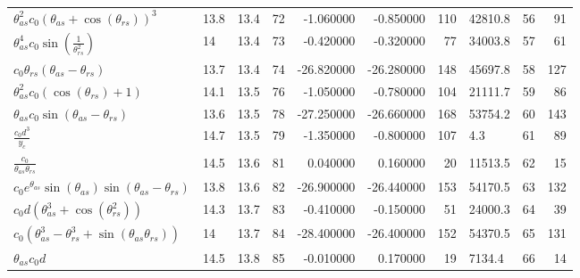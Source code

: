\begin{tabularx}{\textwidth}{lllrrrrlrr}
$ \theta_{as}^{2} c_{0} \left(\theta_{as} + \cos{\left(\theta_{rs} \right)}\right)^{3} $  &  13.8  &  13.4  &  72  &  -1.060000  &  -0.850000  &  110  &  42810.8  &  56\phantom{.000000}  &  91\phantom{.000000}  \\ 
$ \theta_{as}^{4} c_{0} \sin{\left(\displaystyle\frac{1}{\theta_{rs}^{2}} \right)} $  &  14\phantom{.0}  &  13.4  &  73  &  -0.420000  &  -0.320000  &  77  &  34003.8  &  57\phantom{.000000}  &  61\phantom{.000000}  \\ 
$ c_{0} \theta_{rs} \left(\theta_{as} - \theta_{rs}\right) $  &  13.7  &  13.4  &  74  &  -26.820000  &  -26.280000  &  148  &  45697.8  &  58\phantom{.000000}  &  127\phantom{.000000}  \\ 
$ \theta_{as}^{2} c_{0} \left(\cos{\left(\theta_{rs} \right)} + 1\right) $  &  14.1  &  13.5  &  76  &  -1.050000  &  -0.780000  &  104  &  21111.7  &  59\phantom{.000000}  &  86\phantom{.000000}  \\ 
$ \theta_{as} c_{0} \sin{\left(\theta_{as} - \theta_{rs} \right)} $  &  13.6  &  13.5  &  78  &  -27.250000  &  -26.660000  &  168  &  53754.2  &  60\phantom{.000000}  &  143\phantom{.000000}  \\ 
$ \displaystyle\frac{c_{0} d^{3}}{y_c} $  &  14.7  &  13.5  &  79  &  -1.350000  &  -0.800000  &  107  &  4.3  &  61\phantom{.000000}  &  89\phantom{.000000}  \\ 
$ \displaystyle\frac{c_{0}}{\theta_{as} \theta_{rs}} $  &  14.5  &  13.6  &  81  &  0.040000  &  0.160000  &  20  &  11513.5  &  62\phantom{.000000}  &  15\phantom{.000000}  \\ 
$ c_{0} e^{\theta_{as}} \sin{\left(\theta_{as} \right)} \sin{\left(\theta_{as} - \theta_{rs} \right)} $  &  13.8  &  13.6  &  82  &  -26.900000  &  -26.440000  &  153  &  54170.5  &  63\phantom{.000000}  &  132\phantom{.000000}  \\ 
$ c_{0} d \left(\theta_{as}^{3} + \cos{\left(\theta_{rs}^{2} \right)}\right) $  &  14.3  &  13.7  &  83  &  -0.410000  &  -0.150000  &  51  &  24000.3  &  64\phantom{.000000}  &  39\phantom{.000000}  \\ 
$ c_{0} \left(\theta_{as}^{3} - \theta_{rs}^{3} + \sin{\left(\theta_{as} \theta_{rs} \right)}\right) $  &  14\phantom{.0}  &  13.7  &  84  &  -28.400000  &  -26.400000  &  152  &  54370.5  &  65\phantom{.000000}  &  131\phantom{.000000}  \\ 
$ \theta_{as} c_{0} d $  &  14.5  &  13.8  &  85  &  -0.010000  &  0.170000  &  19  &  7134.4  &  66\phantom{.000000}  &  14\phantom{.000000}  \\ 

\end{tabularx}
